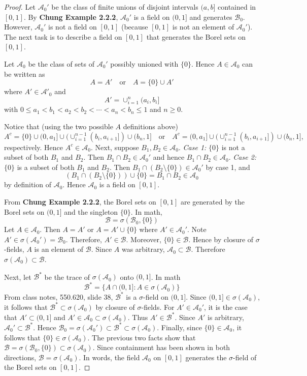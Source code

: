 \documentclass[letterpaper, 12pt]{article}
\newcommand{\cA}{\mathcal{A}}
\newcommand{\sB}{\mathscr{B}}
\begin{document}
\begin{proof}
Let $\cA_0'$ be the class of finite unions of disjoint intervals $(a,b]$ contained in $[0,1]$. By \textbf{Chung Example 2.2.2}, $\cA_0'$ is a field on $(0,1]$ and generates $\sB_0$. However, $\cA_0'$ is not a field on $[0,1]$ (because $[0,1]$ is not an element of $\cA_0'$). The next task is to describe a field on $[0,1]$ that generates the Borel sets on $[0,1]$. 

Let $\cA_0$ be the class of sets of $\cA_0'$ possibly unioned with $\{0\}$. Hence $A \in \cA_0$ can be written as
\[
A = A'
\quad
\text{or}
\quad
A = \{0\} \cup A'
\] 
where $A' \in \cA'_0$ and
\[
A' = \cup_{i=1}^n (a_i, b_i]
\]
with
$0 \leq a_1 < b_1 < a_2 < b_2 < \cdots < a_n < b_n \leq 1$ and $n \geq 0$.

Notice that (using the two possible $A$ definitions above)
\[
A^c = \{0\} \cup (0, a_1] \cup (\cup_{i=1}^{n-1} (b_i, a_{i+1}]) \cup (b_n, 1]
\quad
\text{or}
\quad
A^c = (0, a_1] \cup (\cup_{i=1}^{n-1} (b_i, a_{i+1}]) \cup (b_n, 1],
\]
respectively. Hence $A^c \in \cA_0$. Next, suppose $B_1, B_2 \in \cA_0$. 
\textit{Case 1:} $\{0\}$ is not a subset of both $B_1$ and $B_2$. Then $B_1 \cap B_2 \in \cA_0'$ and hence $B_1 \cap B_2 \in \cA_0$. 
\textit{Case 2:} $\{0\}$ is a subset of both $B_1$ and $B_2$.
Then $B_1 \cap (B_2 \setminus \{0\}) \in \cA_0'$ by case 1, and 
\[
(B_1 \cap (B_2 \setminus \{0\})) \cup \{0\} =
B_1 \cap B_2 
\in \cA_0
\]
by definition of $\cA_0$. Hence $\cA_0$ is a field on $[0,1]$. 

From \textbf{Chung Example 2.2.2}, the Borel sets on $[0,1]$ are generated by the Borel sets on $(0,1]$ and the singleton $\{0\}$. In math, 
\[
\sB = \sigma(\sB_0, \{0\})
\]
Let $A \in \cA_0$. Then $A = A'$ or $A = A' \cup \{0\}$ where $A' \in \cA_0'$. 
Note $A' \in \sigma(\cA_0') = \sB_0$. Therefore, $A' \in \sB$. Moreover, $\{0\} \in \sB$.
Hence by closure of $\sigma$-fields, $A$ is an element of $\sB$. Since $A$ was arbitrary, $\cA_0 \subset \sB$. Therefore $\sigma(\cA_0) \subset \sB$.

Next, let $\sB^*$ be the trace of $\sigma(\cA_0)$ onto $(0,1]$. In math
\[
\sB^* = \{ A \cap (0,1] : A \in \sigma(\cA_0)   \}
\]
From class notes, 550.620, slide 38, $\sB^*$ is a $\sigma$-field on $(0,1]$. Since $(0,1] \in \sigma(\cA_0)$, it follows that $\sB^* \subset \sigma(\cA_0)$ by closure of $\sigma$-fields. For $A' \in \cA_0'$, it is the case that $A' \subset (0,1]$ and $A' \in \cA_0 \subset \sigma(\cA_0)$. Thus $A' \in \sB^*$. 
Since $A'$ is arbitrary, $\cA_0' \subset \sB^*$. Hence $\sB_0 = \sigma(\cA_0') \subset \sB^* \subset \sigma(\cA_0)$. Finally, since $\{0\} \in \cA_0$, it follows that  $\{0\} \in \sigma(\cA_0)$. The previous two facts show that $\sB = \sigma(\sB_0, \{0\}) \subset \sigma(\cA_0)$. Since containment has been shown in both directions, $\sB = \sigma(\cA_0)$. In words, the field $\cA_0$ on $[0,1]$ generates the $\sigma$-field of the Borel sets on $[0,1]$.


\end{proof}
\end{document}
